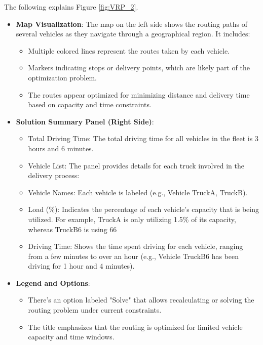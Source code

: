 \documentclass[a4paper,12pt, final]{article}
\begin{document}
The following explains Figure \ref{fig:VRP_2}.
\begin{itemize}
    
    \item \textbf{Map Visualization}: The map on the left side shows the routing paths of several vehicles as they navigate through a geographical region. It includes:
        \begin{itemize}
            \item Multiple colored lines represent the routes taken by each vehicle.
            \item Markers indicating stops or delivery points, which are likely part of the optimization problem.
            \item The routes appear optimized for minimizing distance and delivery time based on capacity and time constraints.
        \end{itemize}

    \item \textbf{Solution Summary Panel (Right Side)}:
        \begin{itemize}
        \item Total Driving Time: The total driving time for all vehicles in the fleet is 3 hours and 6 minutes.
        \item Vehicle List: The panel provides details for each truck involved in the delivery process:
        \item Vehicle Names: Each vehicle is labeled (e.g., Vehicle TruckA, TruckB).
        \item Load (\%): Indicates the percentage of each vehicle’s capacity that is being utilized. For example, TruckA is only utilizing 1.5\% of its capacity, whereas TruckB6 is using 66%
        \item Driving Time: Shows the time spent driving for each vehicle, ranging from a few minutes to over an hour (e.g., Vehicle TruckB6 has been driving for 1 hour and 4 minutes).
    \end{itemize}

    \item \textbf{Legend and Options}:
        \begin{itemize}
            \item There’s an option labeled "Solve" that allows recalculating or solving the routing problem under current constraints.

            \item The title emphasizes that the routing is optimized for limited vehicle capacity and time windows.
        \end{itemize}

\end{itemize}
\newpage
\end{document}
